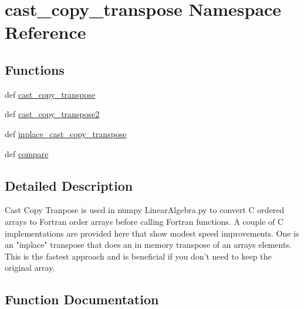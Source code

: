 \hypertarget{namespacecast__copy__transpose}{}\section{cast\+\_\+copy\+\_\+transpose Namespace Reference}
\label{namespacecast__copy__transpose}
\subsection*{Functions}
\begin{DoxyCompactItemize}
\item 
def \hyperlink{namespacecast__copy__transpose_a556f2ae20ea13bb89d5afdb9079dcb4e}{cast\+\_\+copy\+\_\+transpose}
\item 
def \hyperlink{namespacecast__copy__transpose_acd0c4d058e08ba28e16d5b57eba1f81c}{cast\+\_\+copy\+\_\+transpose2}
\item 
def \hyperlink{namespacecast__copy__transpose_a4b99c979ea2cc4f8e486a9bc9a100611}{inplace\+\_\+cast\+\_\+copy\+\_\+transpose}
\item 
def \hyperlink{namespacecast__copy__transpose_a495b02e3ebddbc44cd7e7d6a655fd7f2}{compare}
\end{DoxyCompactItemize}


\subsection{Detailed Description}
\begin{DoxyVerb}Cast Copy Tranpose is used in numpy LinearAlgebra.py to convert
C ordered arrays to Fortran order arrays before calling Fortran
functions.  A couple of C implementations are provided here that
show modest speed improvements.  One is an "inplace" transpose that
does an in memory transpose of an arrays elements.  This is the
fastest approach and is beneficial if you don't need to keep the
original array.
\end{DoxyVerb}
 

\subsection{Function Documentation}
\hypertarget{namespacecast__copy__transpose_a556f2ae20ea13bb89d5afdb9079dcb4e}{}
